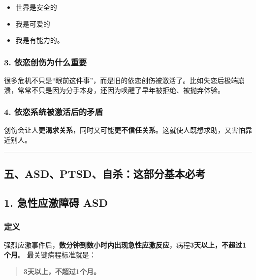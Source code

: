 \documentclass[
  a4paper,
]{ctexart}
\providecommand{\tightlist}{%
  \setlength{\itemsep}{0pt}\setlength{\parskip}{0pt}}
\begin{document}
\begin{itemize}
\tightlist
\item
  世界是安全的
\item
  我是可爱的
\item
  我是有能力的。
\end{itemize}

\subsubsection{3.
依恋创伤为什么重要}\label{ux4f9dux604bux521bux4f24ux4e3aux4ec0ux4e48ux91cdux8981}

很多危机不只是``眼前这件事''，而是旧的依恋创伤被激活了。比如失恋后极端崩溃，常常不只是因为分手本身，还因为唤醒了早年被拒绝、被抛弃体验。

\subsubsection{4.
依恋系统被激活后的矛盾}\label{ux4f9dux604bux7cfbux7edfux88abux6fc0ux6d3bux540eux7684ux77dbux76fe}

创伤会让人\textbf{更渴求关系}，同时又可能\textbf{更不信任关系}。这就使人既想求助，又害怕靠近别人。

\begin{center}\rule{0.5\linewidth}{0.5pt}\end{center}

\subsection{五、ASD、PTSD、自杀：这部分基本必考}\label{ux4e94asdptsdux81eaux6740ux8fd9ux90e8ux5206ux57faux672cux5fc5ux8003}

\subsection{1. 急性应激障碍
ASD}\label{ux6025ux6027ux5e94ux6fc0ux969cux788d-asd}

\subsubsection{定义}\label{ux5b9aux4e49}

强烈应激事件后，\textbf{数分钟到数小时内出现急性应激反应}，病程\textbf{3天以上，不超过1个月}。
最关键病程标准就是：

\begin{quote}
\textbf{3天以上，不超过1个月。}
\end{quote}
\end{document}
